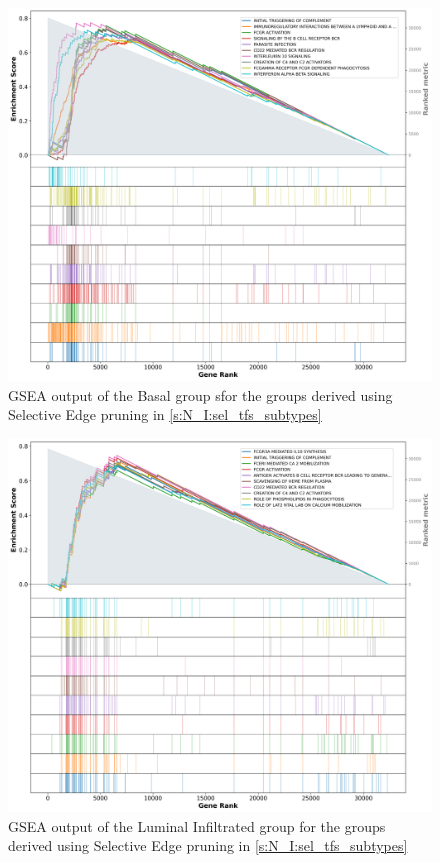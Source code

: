 \begin{figure}[!htb]
    \centering
    \includegraphics[width=\textwidth,keepaspectratio]{Sections/Network_I/Resources/selective_pruning/gsea/largeBasal_10_top_manTerms.png}
    \caption{GSEA output of the Basal group sfor the groups derived using Selective Edge pruning in  \cref{s:N_I:sel_tfs_subtypes}}
    \label{fig:ap:gsea_largeBasal}
\end{figure}

\begin{figure}[!htb]
    \centering
    \includegraphics[width=\textwidth,keepaspectratio]{Sections/Network_I/Resources/selective_pruning/gsea/lumInf_10_top_manTerms.png}
    \caption{GSEA output of the Luminal Infiltrated group for the groups derived using Selective Edge pruning in  \cref{s:N_I:sel_tfs_subtypes}}
    \label{fig:ap:gsea_lumInf}
\end{figure}

